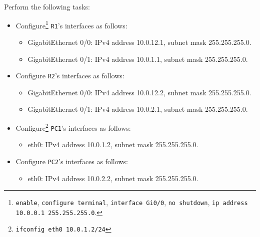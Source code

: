 \documentclass[pdftex,12pt,a4paper]{article}
\begin{document}
            Perform the following tasks:
            \begin{itemize}
                \item Configure\footnote{\texttt{enable}, \texttt{configure
                        terminal}, \texttt{interface Gi0/0}, \texttt{no
                        shutdown}, \texttt{ip address
                    10.0.0.1 255.255.255.0}.} \texttt{R1}'s interfaces as follows:
                    \begin{itemize}
                        \item GigabitEthernet 0/0: IPv4 address 10.0.12.1,
                            subnet mask 255.255.255.0.
                        \item GigabitEthernet 0/1: IPv4 address 10.0.1.1,
                            subnet mask 255.255.255.0.
                    \end{itemize}
                \item Configure \texttt{R2}'s interfaces as follows:
                    \begin{itemize}
                        \item GigabitEthernet 0/0: IPv4 address 10.0.12.2,
                            subnet mask 255.255.255.0.
                        \item GigabitEthernet 0/1: IPv4 address 10.0.2.1,
                            subnet mask 255.255.255.0.
                    \end{itemize}
                \item Configure\footnote{\texttt{ifconfig eth0 10.0.1.2/24}}
                    \texttt{\texttt{PC1}}'s interfaces as follows:
                    \begin{itemize}
                        \item eth0: IPv4 address 10.0.1.2,
                            subnet mask 255.255.255.0.
                    \end{itemize}
                \item Configure \texttt{\texttt{PC2}}'s interfaces as follows:
                    \begin{itemize}
                        \item eth0: IPv4 address 10.0.2.2,
                            subnet mask 255.255.255.0.
                    \end{itemize}
            \end{itemize}
\end{document}
